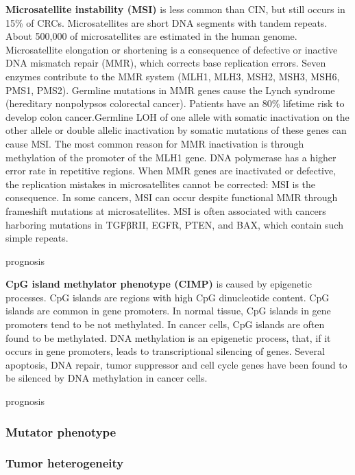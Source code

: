       \textbf{Microsatellite instability (MSI)} is less common than CIN, but
      still occurs in 15\% of CRCs.  Microsatellites are short DNA segments with
      tandem repeats. About 500,000 of microsatellites are estimated in the
      human genome. Microsatellite elongation or shortening is a consequence of
      defective or inactive DNA mismatch repair (MMR), which corrects base
      replication errors. Seven enzymes contribute to the MMR system (MLH1,
      MLH3, MSH2, MSH3, MSH6, PMS1, PMS2). Germline mutations in MMR genes cause
      the Lynch syndrome (hereditary nonpolypsos colorectal cancer). Patients
      have an 80\% lifetime risk to develop colon cancer.Germline LOH of one
      allele with somatic inactivation on the other allele or double allelic
      inactivation by somatic mutations of these genes can cause MSI. The most
      common reason for MMR inactivation is through methylation of the promoter
      of the MLH1 gene. DNA polymerase has a higher error rate in repetitive
      regions. When MMR genes are inactivated or defective, the replication
      mistakes in microsatellites cannot be corrected: MSI is the consequence.
      In some cancers, MSI can occur despite functional MMR through frameshift
      mutations at microsatellites. MSI is often associated with cancers
      harboring mutations in TGFβRII, EGFR, PTEN, and BAX, which contain such
      simple repeats.

      prognosis

      \textbf{CpG island methylator phenotype (CIMP)} is caused by epigenetic
      processes. CpG islands are regions with high CpG dinucleotide content.
      CpG islands are common in gene promoters. In normal tissue, CpG islands in
      gene promoters tend to be not methylated. In cancer cells, CpG islands are
      often found to be methylated. DNA methylation is an epigenetic process,
      that, if it occurs in gene promoters, leads to transcriptional silencing
      of genes. Several apoptosis, DNA repair, tumor suppressor and cell cycle
      genes have been found to be silenced by DNA methylation in cancer cells.

      prognosis


    \subsubsection{Mutator phenotype}

    \subsubsection{Tumor heterogeneity}

